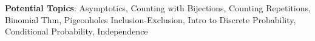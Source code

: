 \documentclass[handout]{mcs}
\begin{document}
\renewcommand{\reading}{
\begin{itemize}
\item Section~
     \bref{asymptotic_sec}.\ \emph{Asymptotic Notation}
\item Chapter~\bref{counting_chap}.\ \emph{Counting}
\item Chapter~\bref{probability_chap}.\ \emph{Intro to Discrete Probability}
\end{itemize}}


\begin{staffnotes}
\textbf{Potential Topics}: Asymptotics, Counting with Bijections,
Counting Repetitions, Binomial Thm, Pigeonholes Inclusion-Exclusion,
Intro to Discrete Probability, Conditional Probability, Independence

\end{staffnotes}






\end{document}
